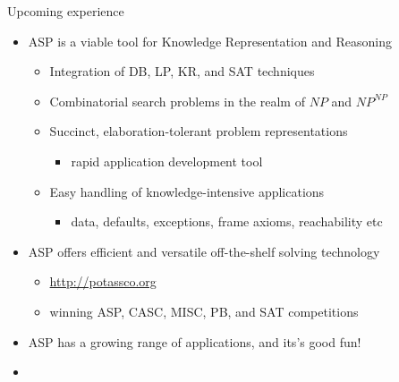 \begin{frame}{Upcoming experience}
  \begin{itemize}
  \item ASP is a viable tool for Knowledge Representation and Reasoning
    \begin{itemize}
    \item Integration of DB, LP, KR, and SAT techniques
    \item Combinatorial search problems in the realm of $\mathit{NP}$ and $\mathit{NP}^\mathit{NP}$
    \item Succinct, elaboration-tolerant problem representations
      \begin{itemize}\small
      \item rapid application development tool
      \end{itemize}
    \item Easy handling of knowledge-intensive applications
      \begin{itemize}\small
      \item
        data,
        defaults,
        exceptions,
        frame axioms,
        reachability
        etc
      \end{itemize}
    \end{itemize}
  \item ASP offers efficient and versatile off-the-shelf solving technology
    \begin{itemize}
    \item \alert{\url{http://potassco.org}}
    \item winning ASP, CASC, MISC, PB, and SAT competitions
    \end{itemize}
  \item ASP has a growing range of applications, and its's good fun!
    \bigskip
  \item []
    \begin{quote}
    \end{quote}
  \end{itemize}
\end{frame}
%
